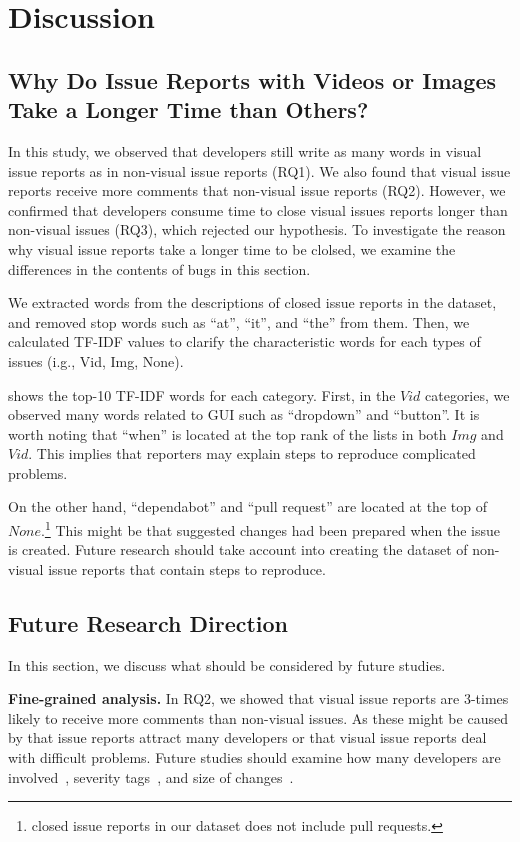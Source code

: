 \section{Discussion}
%
\subsection{Why Do Issue Reports with Videos or Images Take a Longer Time than Others?}
In this study, we observed that developers still write as many words in visual issue reports as in non-visual issue reports (RQ1). We also found that visual issue reports receive more comments that non-visual issue reports (RQ2). 
However, we confirmed that developers consume time to close visual issues reports longer than non-visual issues (RQ3), which rejected our hypothesis. To investigate the reason why visual issue reports take a longer time to be clolsed, we examine the differences in the contents of bugs in this section. 

We extracted words from the descriptions of closed issue reports in the dataset, and  removed stop words such as ``at'', ``it'', and ``the'' from them. Then, we calculated TF-IDF values to clarify the characteristic words for each types of issues (i.g., Vid, Img, None). 

 shows the top-10 TF-IDF words for each category.
First, in the $Vid$ categories, we observed many words  related to GUI such as ``dropdown'' and ``button''. It is worth noting that ``when'' is located at the top rank of the lists in both $Img$ and $Vid$. This implies that reporters may explain steps to reproduce complicated problems. 

On the other hand, ``dependabot'' and ``pull request'' are located at the top of  $None$.\footnote{closed issue reports in our dataset does not include pull requests.} This might be that suggested changes had been prepared when the issue is created. Future research should take account into creating the dataset of non-visual issue reports that contain steps to reproduce. 



\subsection{Future Research Direction}
In this section, we discuss what should be considered by future studies. 

\noindent
\textbf{Fine-grained analysis. }
In RQ2, we showed that visual issue reports are 3-times likely to receive more comments than non-visual issues. As these might be caused by that  issue reports attract many developers or that visual issue reports deal with difficult problems. Future studies should examine how many developers are involved~\citep{DBLP:conf/icsm/BavotaR15}, severity tags~\citep{DBLP:conf/issre/ZhouNG15}, and size of changes~\citep{DBLP:conf/kbse/HattoriL08}.


